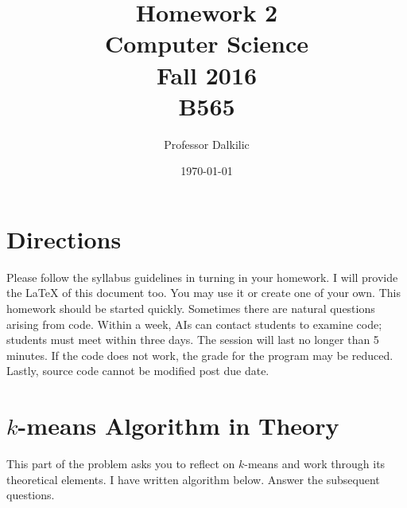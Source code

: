 \documentclass{article}
\begin{document}
\title{Homework 2\\ Computer Science \\ Fall 2016\\ B565}         %
\author{Professor Dalkilic}        %
\date{\today}          %
\maketitle
\makeatother     %
\pagestyle{plain}
\section*{Directions}
Please follow the syllabus guidelines in turning in your homework.  I will provide the \LaTeX{} of this document too.  You may use it or create one of your own.  This homework should be started quickly.   Sometimes there are natural questions arising from code.  Within a week, AIs can contact students to examine code; students must meet within three days.  The session will last no longer than 5 minutes.  If the code does not work, the grade for the program may be reduced.  Lastly, source code cannot be modified post due date.

\section*{$k$-means Algorithm in Theory}
This part of the problem asks you to reflect on $k$-means and work through its theoretical elements.  I have written algorithm below.   Answer the subsequent questions.
\end{document}
